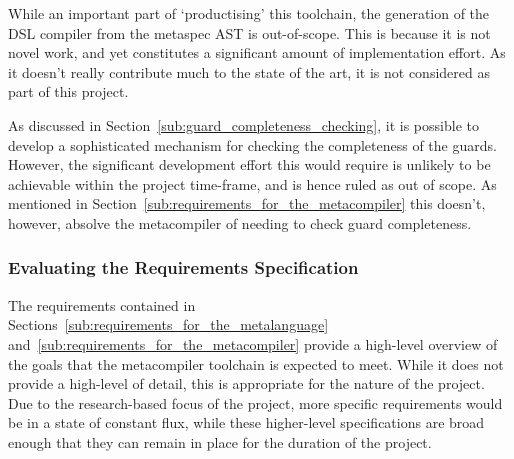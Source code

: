
While an important part of `productising' this toolchain, the generation of the DSL compiler from the metaspec AST is out-of-scope.
This is because it is not novel work, and yet constitutes a significant amount of implementation effort. 
As it doesn't really contribute much to the state of the art, it is not considered as part of this project.\\


As discussed in Section~\ref{sub:guard_completeness_checking}, it is possible to develop a sophisticated mechanism for checking the completeness of the guards.
However, the significant development effort this would require is unlikely to be achievable within the project time-frame, and is hence ruled as out of scope. 
As mentioned in Section~\ref{sub:requirements_for_the_metacompiler} this doesn't, however, absolve the metacompiler of needing to check guard completeness. 


\subsubsection{Evaluating the Requirements Specification} %
\label{ssub:evaluating_the_requirements_specification}
The requirements contained in Sections~\ref{sub:requirements_for_the_metalanguage} and~\ref{sub:requirements_for_the_metacompiler} provide a high-level overview of the goals that the metacompiler toolchain is expected to meet. 
While it does not provide a high-level of detail, this is appropriate for the nature of the project.\\

Due to the research-based focus of the project, more specific requirements would be in a state of constant flux, while these higher-level specifications are broad enough that they can remain in place for the duration of the project.



